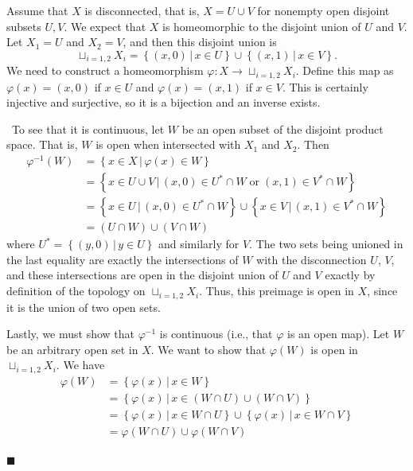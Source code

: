 \documentclass[12pt]{article}
\renewcommand{\qed}{\hfill$\blacksquare$}
\renewenvironment{proof}{\begin{addmargin}[1em]{0em}\begin{newproof}}{\end{newproof}\end{addmargin}\qed}
\begin{document}
\begin{proof}
Assume that $X$ is disconnected, that is, $X=U\cup V$ for nonempty open disjoint subsets $U,V$. We expect that $X$ is homeomorphic to the disjoint union of $U$ and $V$. Let $X_1 = U$ and $X_2=V$, and then this disjoint union is $$\sqcup_{i=1,2} X_i = \left\{ \left(x,0\right) \, | \, x\in U\right\}\cup\left\{ \left(x,1\right) \, | \, x\in V\right\}.$$ We need to construct a homeomorphism $\varphi:X \rightarrow \sqcup_{i=1,2} X_i$. Define this map as $\varphi\left(x\right) = \left(x,0\right)$ if $x\in U$ and $\varphi\left(x\right)=\left(x,1\right)$ if $x\in V$. This is certainly injective and surjective, so it is a bijection and an inverse exists.



\
To see that it is continuous, let $W$ be an open subset of the disjoint product space. That is, $W$ is open when intersected with $X_1$ and $X_2$. Then
\begin{equation*}\begin{split}
\varphi^{-1}\left(W\right) & = \left\{ x\in X \, | \, \varphi\left(x\right) \in W\right\} \\
& = \left\{ x\in U\cup V \, | \, \left(x,0\right)\in U^*\cap W \; \text{or} \; \left(x,1\right)\in V^*\cap W \right\} \\
& = \left\{x \in U \, | \, \left(x,0\right) \in U^*\cap W\right\} \cup \left\{ x\in V \, | \, \left(x,1\right) \in V^* \cap W\right\} \\
& = \left(U\cap W\right)\cup \left(V\cap W\right)
\end{split}\end{equation*}
where $U^* = \left\{\left(y,0\right) \, | \, y\in U\right\}$ and similarly for $V$. The two sets being unioned in the last equality are exactly the intersections of $W$ with the disconnection $U$, $V$, and these intersections are open in the disjoint union of $U$ and $V$ exactly by definition of the topology on $\sqcup_{i=1,2} X_i$. Thus, this preimage is open in $X$, since it is the union of two open sets.

Lastly, we must show that $\varphi^{-1}$ is continuous (i.e., that $\varphi$ is an open map). Let $W$ be an arbitrary open set in $X$. We want to show that $\varphi\left(W\right)$ is open in $\sqcup_{i=1,2} X_i$. We have
\begin{equation*}
\begin{split}
\varphi\left(W\right) & = \left\{ \varphi\left(x\right) \, | \, x \in W\right\} \\
& = \left\{ \varphi\left(x\right) \, | \, x\in \left(W\cap U\right)\cup \left(W\cap V\right) \right\} \\
& = \left\{\varphi\left(x\right) \, | \, x\in W\cap U \right\}\cup\left\{\varphi\left(x\right) \, | \, x\in W\cap V \right\} \\
& = \varphi\left(W\cap U\right)\cup \varphi\left(W\cap V\right)\\
\end{split}
\end{equation*}
\end{proof}












\end{document}
